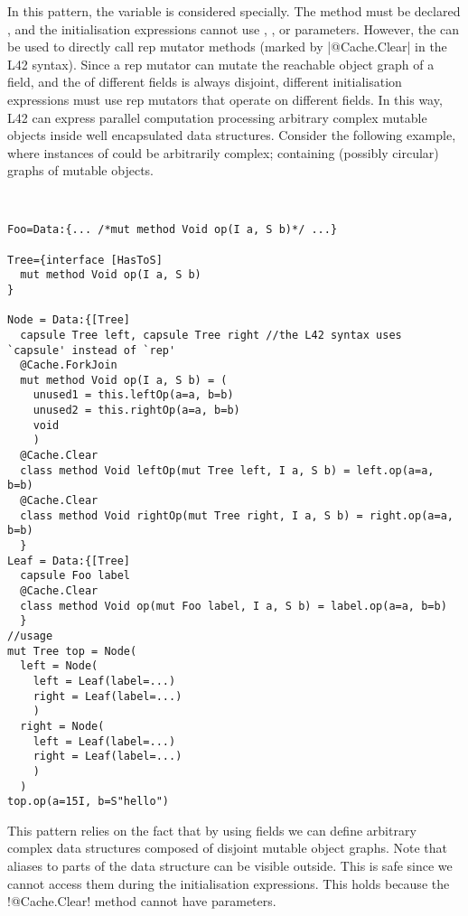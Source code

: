 In this pattern, the \Q@this@ variable is considered specially.
The method must be declared \Q@mut@, and the 
initialisation expressions cannot
use \Q@mut@, \Q@lent@, or \Q@read@ parameters.
However, the \Q@mut@ \Q@this@ can be used to directly call
rep mutator methods (marked by \Q|@Cache.Clear| in the L42 syntax).
Since a rep mutator can mutate the reachable object graph of a \Q@rep@ field, and the \mrog of different \Q@rep@ fields is always disjoint, 
different initialisation expressions must use rep mutators that operate on different \Q@rep@ fields.
In this way, L42 can express parallel computation processing arbitrary complex mutable objects inside well encapsulated data structures.
Consider the following example, where instances of \Q@Foo@ could be arbitrarily complex; containing (possibly circular) graphs of mutable objects.
\begin{lstlisting}[deletekeywords=label]


Foo=Data:{... /*mut method Void op(I a, S b)*/ ...}

Tree={interface [HasToS]
  mut method Void op(I a, S b)
}

Node = Data:{[Tree] 
  capsule Tree left, capsule Tree right //the L42 syntax uses `capsule' instead of `rep'
  @Cache.ForkJoin
  mut method Void op(I a, S b) = (
    unused1 = this.leftOp(a=a, b=b)
    unused2 = this.rightOp(a=a, b=b)
    void
    )
  @Cache.Clear
  class method Void leftOp(mut Tree left, I a, S b) = left.op(a=a, b=b)
  @Cache.Clear
  class method Void rightOp(mut Tree right, I a, S b) = right.op(a=a, b=b)
  }
Leaf = Data:{[Tree]
  capsule Foo label
  @Cache.Clear
  class method Void op(mut Foo label, I a, S b) = label.op(a=a, b=b)
  }
//usage
mut Tree top = Node(
  left = Node(
    left = Leaf(label=...)
    right = Leaf(label=...)
    )
  right = Node(
    left = Leaf(label=...)
    right = Leaf(label=...)
    )
  )
top.op(a=15I, b=S"hello")
\end{lstlisting}

This pattern relies on the fact that by using \Q@rep@ fields we can define arbitrary complex data structures composed of disjoint mutable object graphs.
Note that \Q@read@ aliases to parts of the data structure can be visible outside.
This is safe since we cannot access them during the initialisation expressions. This holds because the \Q!@Cache.Clear! method cannot have \Q@read@ parameters. %

